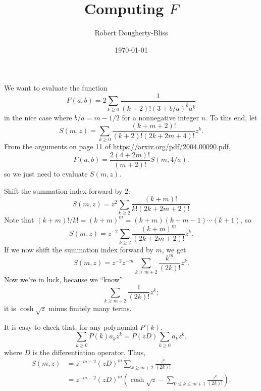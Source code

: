 \documentclass{rudin}
\title{Computing $F$}
\author{Robert Dougherty-Bliss}
\date{\today}
\begin{document}
\maketitle

We want to evaluate the function
\begin{equation*}
    F(a, b) = 2 \sum_{k \geq 0} \frac{1}{(k + 2)! (3 + b / a)^{\overline{k}} a^k}
\end{equation*}
in the nice case where $b / a = m - 1/2$ for a nonnegative integer $n$. To this
end, let
\begin{equation*}
    S(m, z) = \sum_{k \geq 0} \frac{(k + m + 2)!}{(k + 2)! (2k + 2m + 4)!} z^k.
\end{equation*}
From the arguments on page 11 of \url{https://arxiv.org/pdf/2004.00090.pdf},
\begin{equation*}
    F(a, b) = \frac{2(4 + 2m)!}{(m + 2)!} S(m, 4 / a).
\end{equation*}
so we just need to evaluate $S(m, z)$.

Shift the summation index forward by $2$:
\begin{equation*}
    S(m, z) = z^2 \sum_{k \geq 2} \frac{(k + m)!}{k! (2k + 2m + 2)!}
\end{equation*}
Note that $(k + m)! / k! = (k + m)^{\underline{m}} = (k + m)(k + m - 1) \cdots
(k + 1)$, so
\begin{equation*}
    S(m, z) = z^{-2} \sum_{k \geq 2} \frac{(k + m)^{\underline{m}}}{(2k + 2m + 2)!} z^k.
\end{equation*}
If we now shift the summation index forward by $m$, we get
\begin{equation*}
    S(m, z) = z^{-2} z^{-m} \sum_{k \geq m + 2} \frac{k^{\underline{m}}}{(2k)!} z^k.
\end{equation*}
Now we're in luck, because we ``know''
\begin{equation*}
    \sum_{k \geq m + 2} \frac{1}{(2k)!} z^k;
\end{equation*}
it is $\cosh \sqrt{z}$ minus finitely many terms.

It is easy to check that, for any polynomial $P(k)$,
\begin{equation*}
    \sum_{k \geq 0} P(k) a_k z^k = P(zD) \sum_{k \geq 0} a_k z^k,
\end{equation*}
where $D$ is the differentiation operator. Thus,
\begin{align*}
    S(m, z) &= z^{-m - 2} (zD)^{\underline{m}} \sum_{k \geq m + 2} \frac{z^k}{(2k)!} \\
            &= z^{-m - 2} (zD)^{\underline{m}} (\cosh \sqrt{z} - \sum_{0 \leq k \leq m + 1} \frac{z^k}{(2k)!}).
\end{align*}
\end{document}
